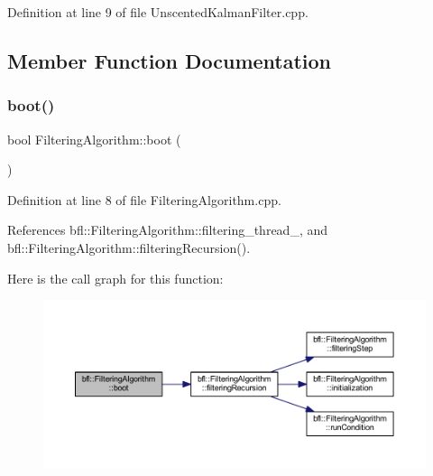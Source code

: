 Definition at line 9 of file Unscented\+Kalman\+Filter.\+cpp.



\subsection{Member Function Documentation}
\mbox{\label{classbfl_1_1FilteringAlgorithm_a96651f8464190c0a56d79219a1017147}} 
\subsubsection{\texorpdfstring{boot()}{boot()}}
{\footnotesize\ttfamily bool Filtering\+Algorithm\+::boot (\begin{DoxyParamCaption}{ }\end{DoxyParamCaption})\hspace{0.3cm}{\ttfamily [inherited]}}



Definition at line 8 of file Filtering\+Algorithm.\+cpp.



References bfl\+::\+Filtering\+Algorithm\+::filtering\+\_\+thread\+\_\+, and bfl\+::\+Filtering\+Algorithm\+::filtering\+Recursion().

Here is the call graph for this function\+:
\nopagebreak
\begin{figure}[H]
\begin{center}
\leavevmode
\includegraphics[width=350pt]{classbfl_1_1FilteringAlgorithm_a96651f8464190c0a56d79219a1017147_cgraph}
\end{center}
\end{figure}
\mbox{\label{classbfl_1_1UnscentedKalmanFilter_a169451bb711a03ad2dc28a40e3ad867f}} 
